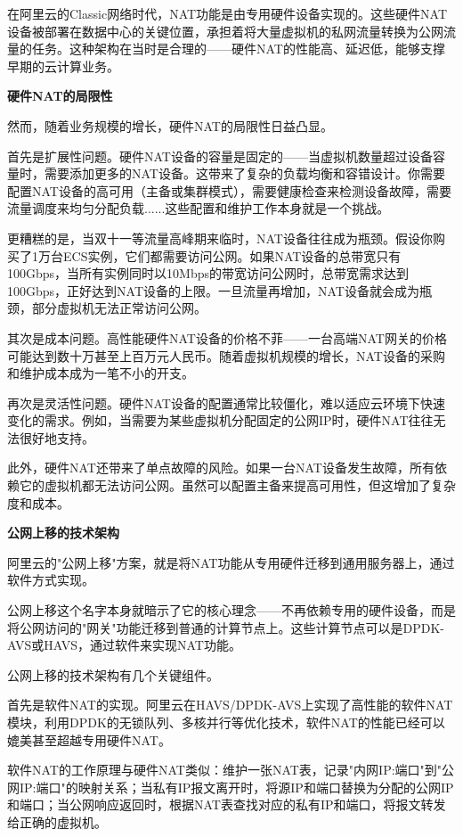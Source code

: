 在阿里云的Classic网络时代，NAT功能是由专用硬件设备实现的。这些硬件NAT设备被部署在数据中心的关键位置，承担着将大量虚拟机的私网流量转换为公网流量的任务。这种架构在当时是合理的——硬件NAT的性能高、延迟低，能够支撑早期的云计算业务。

\textbf{硬件NAT的局限性}

然而，随着业务规模的增长，硬件NAT的局限性日益凸显。

首先是扩展性问题。硬件NAT设备的容量是固定的——当虚拟机数量超过设备容量时，需要添加更多的NAT设备。这带来了复杂的负载均衡和容错设计。你需要配置NAT设备的高可用（主备或集群模式），需要健康检查来检测设备故障，需要流量调度来均匀分配负载......这些配置和维护工作本身就是一个挑战。

更糟糕的是，当双十一等流量高峰期来临时，NAT设备往往成为瓶颈。假设你购买了1万台ECS实例，它们都需要访问公网。如果NAT设备的总带宽只有100Gbps，当所有实例同时以10Mbps的带宽访问公网时，总带宽需求达到100Gbps，正好达到NAT设备的上限。一旦流量再增加，NAT设备就会成为瓶颈，部分虚拟机无法正常访问公网。

其次是成本问题。高性能硬件NAT设备的价格不菲——一台高端NAT网关的价格可能达到数十万甚至上百万元人民币。随着虚拟机规模的增长，NAT设备的采购和维护成本成为一笔不小的开支。

再次是灵活性问题。硬件NAT设备的配置通常比较僵化，难以适应云环境下快速变化的需求。例如，当需要为某些虚拟机分配固定的公网IP时，硬件NAT往往无法很好地支持。

此外，硬件NAT还带来了单点故障的风险。如果一台NAT设备发生故障，所有依赖它的虚拟机都无法访问公网。虽然可以配置主备来提高可用性，但这增加了复杂度和成本。

\textbf{公网上移的技术架构}

阿里云的"公网上移"方案，就是将NAT功能从专用硬件迁移到通用服务器上，通过软件方式实现。

公网上移这个名字本身就暗示了它的核心理念——不再依赖专用的硬件设备，而是将公网访问的"网关"功能迁移到普通的计算节点上。这些计算节点可以是DPDK-AVS或HAVS，通过软件来实现NAT功能。

公网上移的技术架构有几个关键组件。

首先是软件NAT的实现。阿里云在HAVS/DPDK-AVS上实现了高性能的软件NAT模块，利用DPDK的无锁队列、多核并行等优化技术，软件NAT的性能已经可以媲美甚至超越专用硬件NAT。

软件NAT的工作原理与硬件NAT类似：维护一张NAT表，记录"内网IP:端口"到"公网IP:端口"的映射关系；当私有IP报文离开时，将源IP和端口替换为分配的公网IP和端口；当公网响应返回时，根据NAT表查找对应的私有IP和端口，将报文转发给正确的虚拟机。

